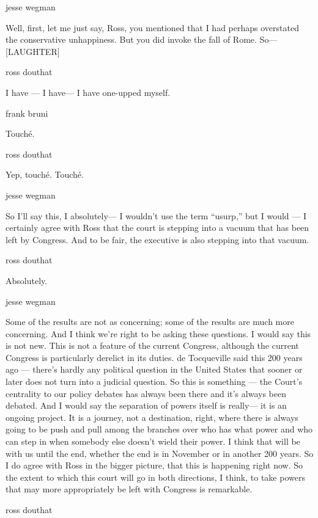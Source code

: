 jesse wegman

Well, first, let me just say, Ross, you mentioned that I had perhaps
overstated the conservative unhappiness. But you did invoke the fall of
Rome. So--- {[}LAUGHTER{]}

ross douthat

I have --- I have--- I have one-upped myself.

frank bruni

Touché.

ross douthat

Yep, touché. Touché.

jesse wegman

So I'll say this, I absolutely--- I wouldn't use the term ``usurp,'' but
I would --- I certainly agree with Ross that the court is stepping into
a vacuum that has been left by Congress. And to be fair, the executive
is also stepping into that vacuum.

ross douthat

Absolutely.

jesse wegman

Some of the results are not as concerning; some of the results are much
more concerning. And I think we're right to be asking these questions. I
would say this is not new. This is not a feature of the current
Congress, although the current Congress is particularly derelict in its
duties. de Tocqueville said this 200 years ago --- there's hardly any
political question in the United States that sooner or later does not
turn into a judicial question. So this is something --- the Court's
centrality to our policy debates has always been there and it's always
been debated. And I would say the separation of powers itself is
really--- it is an ongoing project. It is a journey, not a destination,
right, where there is always going to be push and pull among the
branches over who has what power and who can step in when somebody else
doesn't wield their power. I think that will be with us until the end,
whether the end is in November or in another 200 years. So I do agree
with Ross in the bigger picture, that this is happening right now. So
the extent to which this court will go in both directions, I think, to
take powers that may more appropriately be left with Congress is
remarkable.

ross douthat

